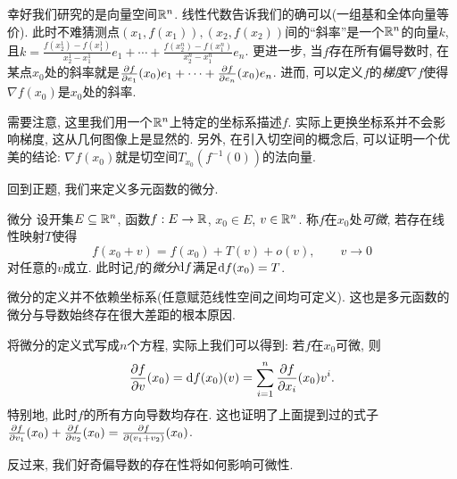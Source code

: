 幸好我们研究的是向量空间$\mathbb{R} ^n$. 线性代数告诉我们的确可以(一组基和全体向量等价). 此时不难猜测点$(x_1,f(x_1)),(x_2,f(x_2))$间的“斜率”是一个$\mathbb{R} ^n$的向量$k$, 且$k= \frac{f(x_2^1)-f(x_1^1)}{x_2^1-x_1^1}e_1 + \cdots + \frac{f(x_2^n)-f(x_1^n)}{x_2^n-x_1^n}e_n$. 更进一步, 当$f$存在所有偏导数时, 在某点$x_0$处的斜率就是$\frac{\partial f}{\partial e_1}(x_0)e_1 + \cdots + \frac{\partial f}{\partial e_n}(x_0)e_n$. 进而, 可以定义$f$的\textit{梯度}$\nabla f$使得$\nabla f(x_0)$是$x_0$处的斜率. 

需要注意, 这里我们用一个$\mathbb{R} ^n$上特定的坐标系描述$f$. 实际上更换坐标系并不会影响梯度, 这从几何图像上是显然的. 另外, 在引入切空间的概念后, 可以证明一个优美的结论: $\nabla f(x_0)$就是切空间$T_{x_0}(f^{-1}(0))$的法向量. 

回到正题, 我们来定义多元函数的微分. 

\begin{definition}{微分}
	设开集$E \subseteq \mathbb{R} ^n$, 函数$f: E \to \mathbb{R}$, $x_0 \in E$, $v \in \mathbb{R} ^n$. 称$f$在$x_0$处\textit{可微}, 若存在线性映射$T$使得$$f(x_0+v) = f(x_0) + T(v) + o(v),\qquad v \to 0$$
	对任意的$v$成立. 此时记$f$的\textit{微分}$\mathop{}\!\mathrm{d} f$满足$\mathop{}\!\mathrm{d} f(x_0)=T$. 
\end{definition}
\begin{remark}
	微分的定义并不依赖坐标系(任意赋范线性空间之间均可定义). 这也是多元函数的微分与导数始终存在很大差距的根本原因. 
\end{remark}

将微分的定义式写成$n$个方程, 实际上我们可以得到: 若$f$在$x_0$可微, 则$$ \frac{\partial f}{\partial v}(x_0) = \mathop{}\!\mathrm{d} f(x_0)(v) = \sum_{i=1}^{n} \frac{\partial f}{\partial x_i}(x_0)v^i.$$
特别地, 此时$f$的所有方向导数均存在. 这也证明了上面提到过的式子$\frac{\partial f}{\partial v_1}(x_0) + \frac{\partial f}{\partial v_2}(x_0) = \frac{\partial f}{\partial (v_1+v_2)}(x_0)$. 

反过来, 我们好奇偏导数的存在性将如何影响可微性. 

